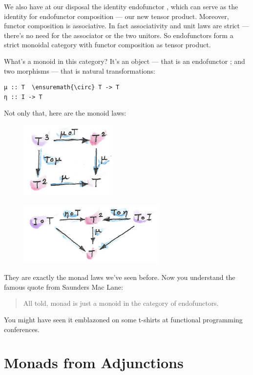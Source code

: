 \noindent
We also have at our disposal the identity endofunctor , which
can serve as the identity for endofunctor composition --- our new tensor
product. Moreover, functor composition is associative. In fact
associativity and unit laws are strict --- there's no need for the
associator or the two unitors. So endofunctors form a strict monoidal
category with functor composition as tensor product.

What's a monoid in this category? It's an object --- that is an
endofunctor ; and two morphisms --- that is natural
transformations:

\begin{Verbatim}[commandchars=\\\{\}]
μ :: T  \ensuremath{\circ} T -> T
η :: I -> T
\end{Verbatim}
Not only that, here are the monoid laws:

\begin{figure}[H]
\centering
\includegraphics[width=1.90625in]{images/assoc.png}
\end{figure}

\begin{figure}[H]
\centering
\includegraphics[width=2.86458in]{images/unitlawcomp.png}
\end{figure}

\noindent
They are exactly the monad laws we've seen before. Now you understand
the famous quote from Saunders Mac Lane:

\begin{quote}
All told, monad is just a monoid in the category of endofunctors.
\end{quote}
You might have seen it emblazoned on some t-shirts at functional
programming conferences.

\section{Monads from Adjunctions}\label{monads-from-adjunctions}

